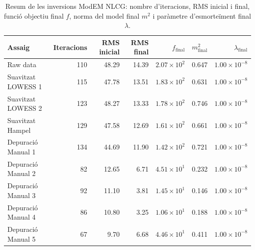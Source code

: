 \begin{table}[htbp]
  \centering
  \caption{Resum de les inversions ModEM NLCG: nombre d'iteracions, RMS inicial i final, funció objectiu final $f$, norma del model final $m^2$ i paràmetre d'esmorteïment final $\lambda$.}
  \label{tab:modem_runs}
  \begin{tabular}{l r r r r r r}
    \toprule
    Assaig & Iteracions & RMS inicial & RMS final & $f_\text{final}$ & $m^2_\text{final}$ & $\lambda_\text{final}$ \\
    \midrule
    Raw data & 110 & 48.29 & 14.39 & $2.07\times10^{2}$ & 0.647 & $1.00\times10^{-8}$ \\
    Suavitzat LOWESS 1 & 115 & 47.78 & 13.51 & $1.83\times10^{2}$ & 0.631 & $1.00\times10^{-8}$ \\
    Suavitzat LOWESS 2 & 123 & 48.27 & 13.33 & $1.78\times10^{2}$ & 0.746 & $1.00\times10^{-8}$ \\
    Suavitzat Hampel & 129 & 47.58 & 12.69 & $1.61\times10^{2}$ & 0.661 & $1.00\times10^{-8}$ \\
    Depuració Manual 1 & 134 & 44.69 & 11.90 & $1.42\times10^{2}$ & 0.721 & $1.00\times10^{-8}$ \\
    Depuració Manual 2 & 82 & 12.65 & 6.71 & $4.51\times10^{1}$ & 0.232 & $1.00\times10^{-8}$ \\
    Depuració Manual 3 & 92 & 11.10 & 3.81 & $1.45\times10^{1}$ & 0.146 & $1.00\times10^{-8}$ \\
    Depuració Manual 4 & 86 & 10.80 & 3.25 & $1.06\times10^{1}$ & 0.188 & $1.00\times10^{-8}$ \\
    Depuració Manual 5 & 67 & 9.70 & 6.68 & $4.46\times10^{1}$ & 0.411 & $1.00\times10^{-8}$ \\
    \bottomrule
  \end{tabular}
\end{table}

